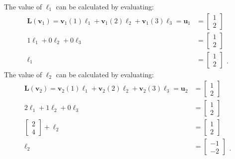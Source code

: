 \documentclass[12pt]{amsart}
\newcommand{\1}{\mathbbm{1}}
\numberwithin{equation}{section}
\numberwithin{Theorem}{section}
\theoremstyle{plain} %
\theoremstyle{definition}
\theoremstyle{remark}
\begin{document}
\begin{enumerate}[1.]
The value of $\boldsymbol{\ell}_{1}$ can be calculated by evaluating:
\begin{align*}
	\mathbf{L}(\mathbf{v}_1) 
	= 
	\mathbf{v}_1(1)\boldsymbol{\ell}_{1} +
	\mathbf{v}_1(2)\boldsymbol{\ell}_{2} +
	\mathbf{v}_1(3)\boldsymbol{\ell}_{3} =
	\mathbf{u}_1 &= \begin{bmatrix} 1 \\ 2 \end{bmatrix} \\
%		
	1\boldsymbol{\ell}_{1} +
	0\boldsymbol{\ell}_{2} +
	0\boldsymbol{\ell}_{3} &=
	\begin{bmatrix}1 \\ 2 \end{bmatrix} \\
%		
	\boldsymbol{\ell}_{1} &=
	\begin{bmatrix}1 \\ 2 \end{bmatrix} 
	\begin{matrix} \\ \\ . \end{matrix}
\end{align*}
The value of $\boldsymbol{\ell}_{2}$ can be calculated by evaluating:  
\begin{align*}
	\mathbf{L}(\mathbf{v}_2) 
	= 
	\mathbf{v}_2(1)\boldsymbol{\ell}_{1} +
	\mathbf{v}_2(2)\boldsymbol{\ell}_{2} +
	\mathbf{v}_2(3)\boldsymbol{\ell}_{3} =
	\mathbf{u}_2 &= \begin{bmatrix} 1 \\ 2 \end{bmatrix} \\
	2\boldsymbol{\ell}_{1} +
	1\boldsymbol{\ell}_{2} +
	0\boldsymbol{\ell}_{3} &=
	\begin{bmatrix}1 \\ 2 \end{bmatrix} \\
	\begin{bmatrix} 2 \\ 4 \end{bmatrix} +
	\boldsymbol{\ell}_{2} &=
	\begin{bmatrix}1 \\ 2 \end{bmatrix} \\
	\boldsymbol{\ell}_{2} &=
	\begin{bmatrix} -1 \\ -2 \end{bmatrix}
	\begin{matrix} \\ \\ . \end{matrix}

\end{align*}
\end{enumerate}
\end{document}
